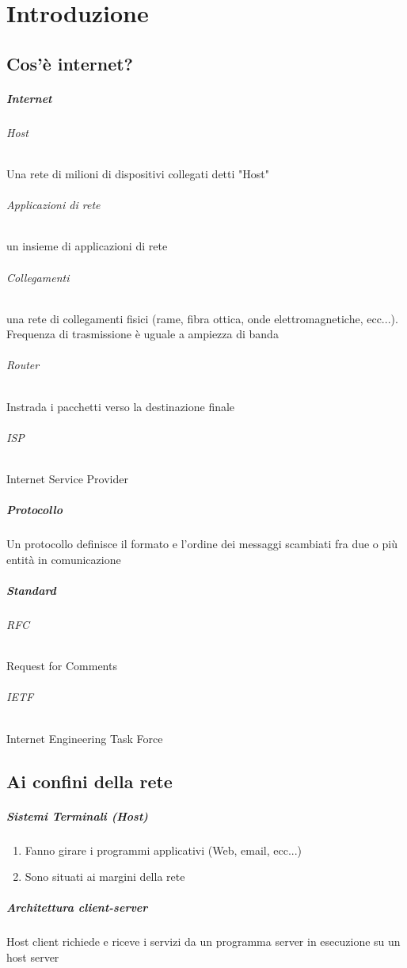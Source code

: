 \setlength{\parskip}{0pt}
\titlespacing*{\subparagraph}{1em}{0em}{0em} 

\chapter{Introduzione}
\thispagestyle{chapterInit}
    \section{Cos'è internet?}
        \paragraph{Internet}
            \subparagraph{Host} Una rete di milioni di dispositivi collegati detti "Host"
            \subparagraph{Applicazioni di rete} un insieme di applicazioni di rete
            \subparagraph{Collegamenti} una rete di collegamenti fisici (rame, fibra ottica, onde elettromagnetiche, ecc...).
                Frequenza di trasmissione è uguale a ampiezza di banda
            \subparagraph{Router} Instrada i pacchetti verso la destinazione finale
            \subparagraph{ISP} Internet Service Provider
        \paragraph{Protocollo} Un protocollo definisce il formato e l’ordine dei messaggi scambiati fra due o più entità in comunicazione 
        \paragraph{Standard} 
            \subparagraph{RFC} Request for Comments
            \subparagraph{IETF} Internet Engineering Task Force
    \section{Ai confini della rete}
        \paragraph{Sistemi Terminali (Host)}
        \begin{enumerate}
            \item Fanno girare i programmi applicativi (Web, email, ecc...)
            \item Sono situati ai margini della rete
        \end{enumerate}
        \paragraph{Architettura client-server} Host client richiede e riceve i servizi da un programma server in esecuzione su un host server
